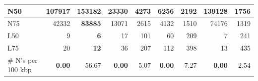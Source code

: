 \documentclass[12pt,a4paper]{article}
\begin{document}
\begin{table}[ht]
\begin{center}
\begin{tabular}{|l*{8}{|r}|}
N50 & 107917 & {\bf 153182} & 23330 & 4273 & 6256 & 2192 & 139128 & 1756 \\ \hline
N75 & 42332 & {\bf 83885} & 13071 & 2615 & 4132 & 1510 & 74176 & 1319 \\ \hline
L50 & 9 & {\bf 6} & 17 & 101 & 60 & 209 & 7 & 241 \\ \hline
L75 & 20 & {\bf 12} & 36 & 207 & 112 & 398 & 13 & 435 \\ \hline
\# N's per 100 kbp & {\bf 0.00} & 56.67 & {\bf 0.00} & 5.07 & {\bf 0.00} & 7.27 & {\bf 0.00} & 2.54 \\ \hline
\end{tabular}
\end{center}
\end{table}
\end{document}
